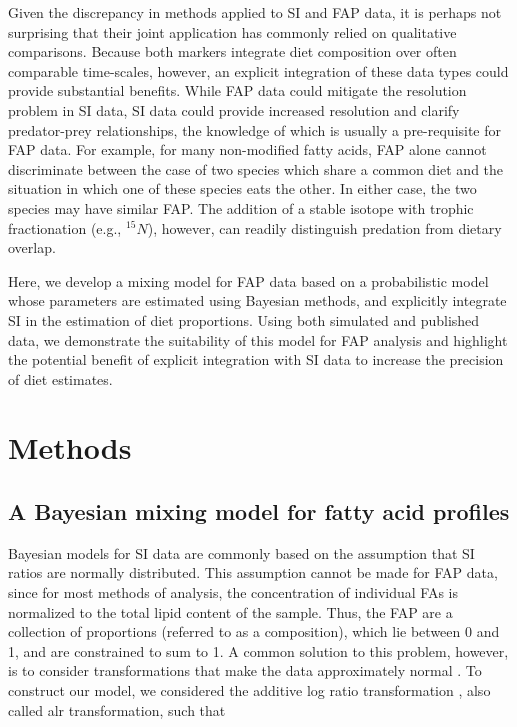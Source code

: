 \documentclass[fleqn,10pt]{wlpeerj}
\begin{document}
Given the discrepancy in methods applied to SI and FAP data, it is
perhaps not surprising that their joint application has commonly
relied on qualitative comparisons. Because both markers integrate diet
composition over often comparable time-scales, however, an explicit
integration of these data types could provide substantial
benefits. While FAP data could mitigate the resolution problem in SI
data, SI data could provide increased resolution and clarify
predator-prey relationships, the knowledge of which is usually a
pre-requisite for FAP data. For example, for many non-modified fatty
acids, FAP alone cannot discriminate between the case of two species
which share a common diet and the situation in which one of these
species eats the other.  In either case, the two species may have
similar FAP. The addition of a stable isotope with trophic
fractionation (e.g., $^{15}N$), however, can readily distinguish predation
from dietary overlap.

Here, we develop a mixing model for FAP data based on a probabilistic
model whose parameters are estimated using Bayesian methods, and
explicitly integrate SI in the estimation of diet proportions. Using both simulated and
published data, we demonstrate the suitability of this model for FAP analysis and
highlight the potential benefit of explicit integration with SI data
to increase the precision of diet estimates.


\section*{Methods}
\subsection*{A Bayesian mixing model for fatty acid profiles}

Bayesian models for SI data are commonly based on the assumption that
SI ratios are normally distributed. This assumption cannot be made for
FAP data, since for most methods of analysis, the concentration of
individual FAs is normalized to the total lipid content of the
sample. Thus, the FAP are a collection of proportions (referred to as
a composition), which lie between 0 and 1, and are constrained to sum
to 1. A common solution to this problem, however, is to consider
transformations that make the data approximately normal
\citep{budge_studying_2006}. To construct our model, we considered the
additive log ratio transformation \citep{aitchison_convex_1999},
also called alr transformation, such that
\end{document}

